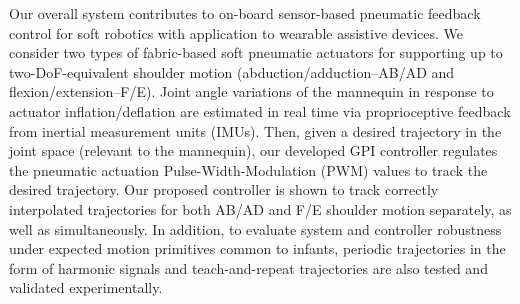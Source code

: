 \documentclass[letterpaper, 10pt, conference]{ieeeconf}      %
\newcommand{\changed}[1]{{\color{red}{#1}}}
\begin{document}




Our overall system contributes to on-board sensor-based pneumatic feedback control for soft robotics with application to wearable assistive devices. We consider two types of fabric-based soft pneumatic actuators for supporting up to two-DoF-equivalent shoulder motion (abduction/adduction--AB/AD and flexion/extension--F/E). 
Joint angle variations of the mannequin in response to actuator inflation/deflation are estimated in real time via proprioceptive feedback from inertial measurement units (IMUs). Then, given a desired trajectory in the joint space (relevant to the mannequin), our developed GPI controller regulates the pneumatic actuation Pulse-Width-Modulation (PWM) values to track the desired trajectory. 
%
Our proposed controller is shown to track correctly interpolated trajectories for both AB/AD and F/E shoulder motion separately, as well as simultaneously. In addition, to evaluate system and controller robustness under expected motion primitives common to infants, periodic trajectories in the form of harmonic signals and teach-and-repeat trajectories are also tested and validated experimentally. 
\end{document}
